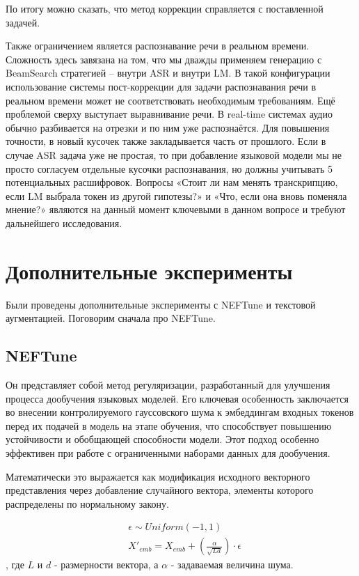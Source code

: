 По итогу можно сказать, что метод коррекции справляется с поставленной задачей.

Также ограничением является распознавание речи в реальном времени.
Сложность здесь завязана на том, что мы дважды применяем генерацию с BeamSearch стратегией -- внутри ASR и внутри LM.
В такой конфигурации использование системы пост-коррекции для задачи распознавания речи в реальном времени может не соответствовать необходимым требованиям.
Ещё проблемой сверху выступает выравнивание речи.
В real-time системах аудио обычно разбивается на отрезки и по ним уже распознаётся.
Для повышения точности, в новый кусочек также закладывается часть от прошлого.
Если в случае ASR задача уже не простая, то при добавление языковой модели мы не просто согласуем отдельные кусочки распознавания, но должны учитывать 5 потенциальных расшифровок.
Вопросы «Стоит ли нам менять транскрипцию, если LM выбрала токен из другой гипотезы?» и «Что, если она вновь поменяла мнение?» являются на данный момент ключевыми в данном вопросе и требуют дальнейшего исследования.

\section{Дополнительные эксперименты}

Были проведены дополнительные эксперименты с NEFTune и текстовой аугментацией.
Поговорим сначала про NEFTune.

\subsection{NEFTune}
Он представляет собой метод регуляризации, разработанный для улучшения процесса дообучения языковых моделей.
Его ключевая особенность заключается во внесении контролируемого гауссовского шума к эмбеддингам входных токенов перед их подачей в модель на этапе обучения, что способствует повышению устойчивости и обобщающей способности модели.
Этот подход особенно эффективен при работе с ограниченными наборами данных для дообучения.

Математически это выражается как модификация исходного векторного представления через добавление случайного вектора, элементы которого распределены по нормальному закону.

\begin{equation}
  \begin{aligned}
    &\epsilon \sim Uniform(-1, 1) \\
    &X'_{emb} = X_{emb} + (\frac{\alpha}{\sqrt{Ld}})\cdot\epsilon  
  \end{aligned}
  \label{eq:neftune}
\end{equation}
, где $L$ и $d$ - размерности вектора, а $\alpha$ - задаваемая величина шума.

